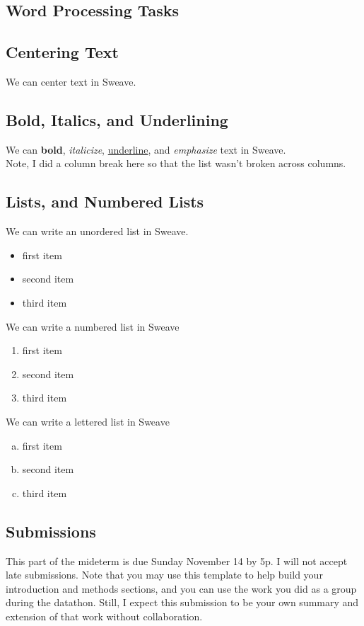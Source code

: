 \documentclass{article}\usepackage[]{graphicx}\usepackage[]{xcolor}
\begin{document}
\begin{multicols}{2}
\section{Word Processing Tasks}
\subsection{Centering Text}
\begin{center}
We can center text in Sweave.
\end{center}
\subsection{Bold, Italics, and Underlining}
\noindent We can \textbf{bold}, \textit{italicize}, \underline{underline}, and \emph{emphasize} text in Sweave. \\Note, I did a column break here so that the list wasn't broken across columns. 
\columnbreak
\subsection{Lists, and Numbered Lists}
\noindent We can write an unordered list in Sweave.
\begin{itemize}\itemsep0em
\item first item
\item second item
\item third item
\end{itemize}
We can write a numbered list in Sweave
\begin{enumerate}[1.]\itemsep0em
\item first item
\item second item
\item third item
\end{enumerate}
We can write a lettered list in Sweave
\begin{enumerate}[a.]\itemsep0em
\item first item
\item second item
\item third item
\end{enumerate}
\subsection{Submissions}
\noindent This part of the mideterm is due Sunday November 14 by 5p. I will not accept late submissions. Note that you may use this template to help build your introduction and methods sections, and you can use the work you did as a group during the datathon. Still, I expect this submission to be your own summary and extension of that work without collaboration.

\end{multicols}
\end{document}
